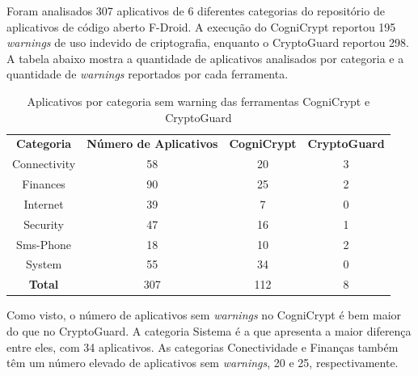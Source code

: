 Foram analisados 307 aplicativos de 6 diferentes categorias do repositório de aplicativos de código aberto F-Droid. A execução do CogniCrypt reportou 195 \textit{warnings} de uso indevido de criptografia, enquanto o CryptoGuard reportou 298. A tabela abaixo mostra a quantidade de aplicativos analisados por categoria e a quantidade de \textit{warnings} reportados por cada ferramenta.

\begin{table}[!htbp]
  \centering
  \begin{tabular}{|c|c|c|c|}
  
    \textbf{Categoria}   & \textbf{Número de Aplicativos}   &  \textbf{CogniCrypt}     &  \textbf{CryptoGuard} \\ 
     Connectivity           & \num{58}                         &  \num{20}                    & \num{3}                     \\
Finances                & \num{90}                         &  \num{25}                    & \num{2}                     \\
Internet                 & \num{39}                         &  \num{7}                      &     \num{0}                  \\
Security                 & \num{47}                         &  \num{16}                    &     \num{1}                  \\
Sms-Phone            & \num{18}                         &  \num{10}                     &     \num{2}                 \\
System                  & \num{55}                        &   \num{34}                    &     \num{0}                  \\
\textbf{Total}        & \num{307}                      &   \num{112}                  &     \num{8}                   \\
\end{tabular}
    
  \caption{Aplicativos por categoria sem warning das ferramentas CogniCrypt e CryptoGuard}
\label{AplicativosSemWarning}
\end{table}

Como visto, o número de aplicativos sem \textit{warnings} no CogniCrypt é bem maior do que no CryptoGuard. A categoria Sistema é a que apresenta a maior diferença entre eles, com \num{34} aplicativos. As categorias Conectividade e Finanças também têm um número elevado de aplicativos sem \textit{warnings}, \num{20} e \num{25}, respectivamente.

